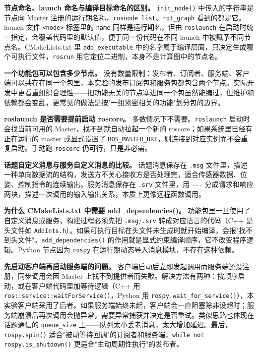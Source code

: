 \documentclass[11pt,a4paper,fontset=fandol]{ctexart}
\begin{document}
\textbf{节点命名、launch 命名与编译目标命名的区别。} \verb|init_node()| 中传入的字符串是节点向 Master 注册的运行期名称，\verb|rosnode list|、\verb|rqt_graph| 看到的都是它。launch 文件 \verb|<node>| 标签里的 \verb|name| 同样是运行期名，但由 \verb|roslaunch| 在启动时统一指定，会覆盖代码里的默认值，便于同一份代码在不同 launch 中被赋予不同节点名。CMakeLists.txt 里 \verb|add_executable| 中的名字属于编译层面，只决定生成哪个可执行文件，\verb|rosrun| 用它定位二进制，本身不是计算图中的节点名。

\textbf{一个功能包可以包含多少节点。} 没有数量限制：发布者、订阅者、服务端、客户端可以共存在同一个包里，本实验的发布订阅包和服务包都包含两个节点。实际开发中更看重组织合理性——把功能无关的节点塞进同一个包虽然能编过，但维护和依赖都会变乱，更常见的做法是按"一组紧密相关的功能"划分包的边界。

\textbf{roslaunch 是否需要提前启动 roscore。} 多数情况下不需要。\verb|roslaunch| 启动时会找当前可用的 Master，找不到就自动拉起一个新的 roscore；如果系统里已经有正在运行的 master 或显式设置了 \verb|ROS_MASTER_URI|，则连接到对应实例而不会重复启动。手动跑 \verb|roscore| 仍可行，只是非必需。

\textbf{话题自定义消息与服务自定义消息的比较。} 话题消息保存在 \verb|.msg| 文件里，描述一种单向数据流的结构，发送方不关心接收方是否处理完，适合传感器数据、位姿、控制指令的连续输出。服务消息保存在 \verb|.srv| 文件里，用 \verb|---| 分成请求和响应两块，描述一次调用的输入输出关系，本质上更像远程函数调用。

\textbf{为什么 CMakeLists.txt 中需要 add\_dependencies()。} 功能包里一旦使用了自定义消息或服务，构建过程必须先把 \verb|.msg|/\verb|.srv| 转成对应语言的代码（C++ 是头文件如 \verb|AddInts.h|）。如果可执行目标在头文件未生成时就开始编译，会报"找不到头文件"。\verb|add_dependencies()| 的作用就是显式约束编译顺序，它不改变程序逻辑。Python 节点因为 \verb|rospy| 在运行期动态导入消息模块，不存在这种依赖。

\textbf{先启动客户端再启动服务端的问题。} 客户端启动后立即发起调用而服务端还没注册，同步调用会因 Master 上找不到提供者而失败。解决方法有两种：按顺序启动，或在客户端代码里加等待逻辑（C++ 用 \verb|ros::service::waitForService()|，Python 用 \verb|rospy.wait_for_service()|），本实验客户端采用了后者。如果服务端始终未起，客户端会一直阻塞除非设超时；服务端崩溃后再次调用会抛异常，需要异常捕获并决定是否重试。类似思路也体现在话题通信的 \verb|queue_size| 上——队列太小丢老消息，太大增加延迟。最后，\verb|rospy.spin()| 适合"被动等待回调"的订阅者和服务端，\verb|while not rospy.is_shutdown()| 更适合"主动周期性执行"的发布者。
\end{document}
